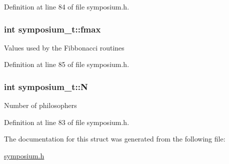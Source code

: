 Definition at line 84 of file symposium.\+h.

\subsubsection[{\texorpdfstring{fmax}{fmax}}]{\setlength{\rightskip}{0pt plus 5cm}int symposium\+\_\+t\+::fmax}\hypertarget{structsymposium__t_a038b49a350225fed31d5c148a9147ec6}{}\label{structsymposium__t_a038b49a350225fed31d5c148a9147ec6}
Values used by the Fibbonacci routines 

Definition at line 85 of file symposium.\+h.

\subsubsection[{\texorpdfstring{N}{N}}]{\setlength{\rightskip}{0pt plus 5cm}int symposium\+\_\+t\+::N}\hypertarget{structsymposium__t_a4e366c10036b2d89ebc2dbcdefba8999}{}\label{structsymposium__t_a4e366c10036b2d89ebc2dbcdefba8999}
Number of philosophers 

Definition at line 83 of file symposium.\+h.



The documentation for this struct was generated from the following file\+:\begin{DoxyCompactItemize}
\item 
\hyperlink{symposium_8h}{symposium.\+h}\end{DoxyCompactItemize}
